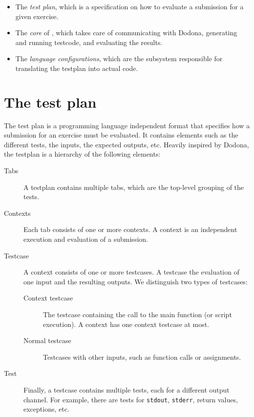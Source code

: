 \begin{multicols}{2}
    \begin{itemize}
        \item The \emph{test plan}, which is a specification on how to evaluate a submission for a given exercise.
        \item The \emph{core} of \tested{}, which takes care of communicating with Dodona, generating and running testcode, and evaluating the results.
        \item The \emph{language configurations}, which are the subsystem responsible for translating the testplan into actual code.
    \end{itemize}
    
    \section{The test plan}\label{sec:the-test-plan}
    
    The test plan is a programming language independent format that specifies how a submission for an exercise must be evaluated.
    It contains elements such as the different tests, the inputs, the expected outputs, etc.
    Heavily inspired by Dodona, the testplan is a hierarchy of the following elements:
    
    \begin{description}
        \item[Tabs] A testplan contains multiple tabs, which are the top-level grouping of the tests.
        \item[Contexts] Each tab consists of one or more contexts. 
        A context is an independent execution and evaluation of a submission.
        \item[Testcase] A context consists of one or more testcases.
        A testcase the evaluation of one input and the resulting outputs.
        We distinguish two types of testcases:
        \begin{description}
            \item[Context testcase] The testcase containing the call to the main function (or script execution).
            A context has one context testcase at most.
            \item[Normal testcase] Testcases with other inputs, such as function calls or assignments.
        \end{description}
        \item[Test] Finally, a testcase contains multiple tests, each for a different output channel.
        For example, there are tests for \texttt{stdout}, \texttt{stderr}, return values, exceptions, etc.
    \end{description}
    

\end{multicols}
